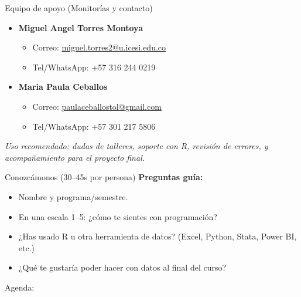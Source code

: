 \documentclass[10pt, xcolor=dvipsnames]{beamer}
\begin{document}
\begin{frame}{Equipo de apoyo (Monitorías y contacto)}
\begin{itemize}
  \item \textbf{Miguel Angel Torres Montoya}
  \begin{itemize}
    \item Correo: \href{mailto:miguel.torres2@u.icesi.edu.co}{miguel.torres2@u.icesi.edu.co}
    \item Tel/WhatsApp: +57 316 244 0219
  \end{itemize} \vspace{0.25cm}
  \item \textbf{Maria Paula Ceballos}
  \begin{itemize}
    \item Correo: \href{mailto:paulaceballostol@gmail.com}{paulaceballostol@gmail.com}
    \item Tel/WhatsApp: +57 301 217 5806
  \end{itemize}
\end{itemize} \vspace{0.25cm}
\footnotesize
\textit{Uso recomendado: dudas de talleres, soporte con R, revisión de errores, y acompañamiento para el proyecto final.}
\end{frame}

\begin{frame}{Conozcámonos (30--45s por persona)}
\textbf{\large Preguntas guía:}  \vspace{0.2cm}
\begin{itemize}
  \item Nombre y programa/semestre. \vspace{0.2cm}
    \vspace{0.2cm}
  \item En una escala 1--5: ¿cómo te sientes con programación?  \vspace{0.2cm}
  \item ¿Has usado R u otra herramienta de datos? (Excel, Python, Stata, Power BI, etc.)  \vspace{0.2cm}
  \item ¿Qué te gustaría poder hacer con datos al final del curso?  \vspace{0.2cm}
\end{itemize}
\end{frame}

\begin{frame}[noframenumbering]{Agenda:}
\tableofcontents[]
\end{frame}
\end{document}
